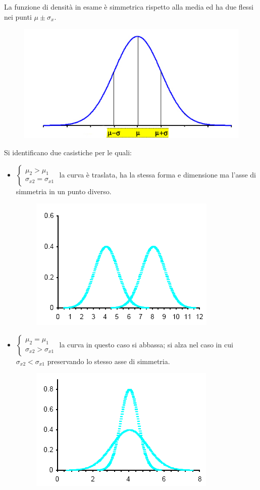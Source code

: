 \documentclass[a4paper, 15pt]{article}
\begin{document}
\begin{adjustwidth}{2in}{}
	 La funzione di densità in esame è simmetrica rispetto alla media ed ha due flessi nei punti $ \mu\pm\sigma_x $.	 	
\begin{figure}[H]
	\centering
	\label{fig:screenshot006}
	\includegraphics[width=0.5\linewidth]{fig/screenshot006}
\end{figure}
	Si identificano due casistiche per le quali:
	\begin{itemize}
	\item \(\begin{cases}
			\mu_2>\mu_1 \\
			\sigma_{x2}=\sigma_{x1}
		\end{cases}\) la curva è traslata, ha la stessa forma e dimensione ma l'asse di simmetria in un punto diverso. 
\begin{figure}[H]
	\centering
	\includegraphics[width=0.3\linewidth]{fig/screenshot004}
	\label{fig:screenshot004}
\end{figure}
	\item \(\begin{cases}
		\mu_2=\mu_1 \\
		\sigma_{x2}>\sigma_{x1}
	\end{cases}\) la curva in questo caso si abbassa; si alza nel caso in cui \( \sigma_{x2}<\sigma_{x1}\) preservando lo stesso asse di simmetria. 
\begin{figure}[H]
	\centering
	\includegraphics[width=0.3\linewidth]{fig/screenshot005}
	\label{fig:screenshot005}
\end{figure}
	\end{itemize}

\end{adjustwidth}
\end{document}
